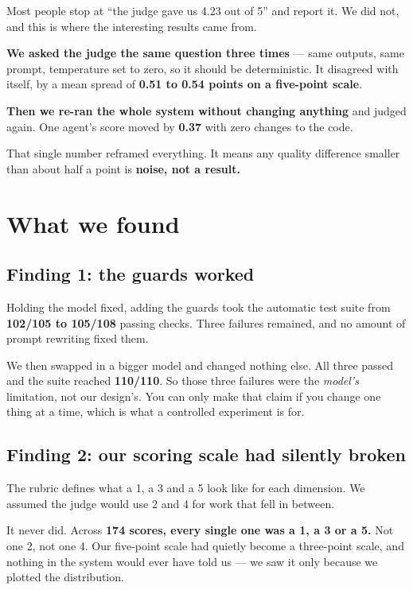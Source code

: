 \documentclass[11pt]{article}
\begin{document}
Most people stop at ``the judge gave us 4.23 out of 5'' and report it. We did
not, and this is where the interesting results came from.

\textbf{We asked the judge the same question three times} --- same outputs, same
prompt, temperature set to zero, so it should be deterministic. It disagreed
with itself, by a mean spread of \textbf{0.51 to 0.54 points on a five-point
scale}.

\textbf{Then we re-ran the whole system without changing anything} and judged
again. One agent's score moved by \textbf{0.37} with zero changes to the code.

\begin{callout}
That single number reframed everything. It means any quality difference smaller
than about half a point is \textbf{noise, not a result.}
\end{callout}

\section{What we found}

\subsection{Finding 1: the guards worked}

Holding the model fixed, adding the guards took the automatic test suite from
\textbf{102/105 to 105/108} passing checks. Three failures remained, and no
amount of prompt rewriting fixed them.

We then swapped in a bigger model and changed nothing else. All three passed and
the suite reached \textbf{110/110}. So those three failures were the
\emph{model's} limitation, not our design's. You can only make that claim if you
change one thing at a time, which is what a controlled experiment is for.

\subsection{Finding 2: our scoring scale had silently broken}

The rubric defines what a 1, a 3 and a 5 look like for each dimension. We
assumed the judge would use 2 and 4 for work that fell in between.

It never did. Across \textbf{174 scores, every single one was a 1, a 3 or a 5.}
Not one 2, not one 4. Our five-point scale had quietly become a three-point
scale, and nothing in the system would ever have told us --- we saw it only
because we plotted the distribution.
\end{document}
